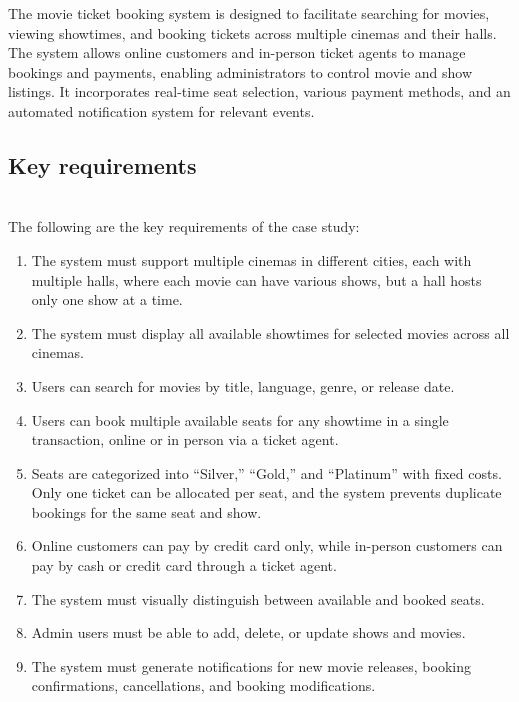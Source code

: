 

The movie ticket booking system is designed to facilitate searching for movies, viewing showtimes, and booking tickets across multiple cinemas and their halls. The system allows online customers and in-person ticket agents to manage bookings and payments, enabling administrators to control movie and show listings. It incorporates real-time seat selection, various payment methods, and an automated notification system for relevant events.

\subsection{Key requirements}\label{v_dDDXgKJIvX60eC_tFhi}
\\
The following are the key requirements of the case study:

\begin{enumerate}
\item
\protect{}\label{7bgZUB8iOsJUqhX29iQMj}
The system must support multiple cinemas in different cities, each with multiple halls, where each movie can have various shows, but a hall hosts only one show at a time.
\item
\protect{}\label{HUV57zh7hbjb2YcYNbRzF}
The system must display all available showtimes for selected movies across all cinemas.
\item
\protect{}\label{YuS1NE1yxQhEVT_qn-jvP}
Users can search for movies by title, language, genre, or release date.
\item
\protect{}\label{Y8sjUhC_GCrP8U_yu92v9}
Users can book multiple available seats for any showtime in a single transaction, online or in person via a ticket agent.
\item
\protect{}\label{ulRDANPtPL1kgRGdhAqiR}
Seats are categorized into ``Silver,'' ``Gold,'' and ``Platinum'' with fixed costs. Only one ticket can be allocated per seat, and the system prevents duplicate bookings for the same seat and show.
\item
\protect{}\label{n80Rczt-RxijxLVB2p80e}
Online customers can pay by credit card only, while in-person customers can pay by cash or credit card through a ticket agent.
\item
\protect{}\label{C0EVOa--OsJN8Y5IMdeJY}
The system must visually distinguish between available and booked seats.
\item
\protect{}\label{TIIDxznRNouIkkd9YPhax}
Admin users must be able to add, delete, or update shows and movies.
\item
\protect{}\label{PzBTicLOThEICIod09-kF}
The system must generate notifications for new movie releases, booking confirmations, cancellations, and booking modifications.
\end{enumerate}

